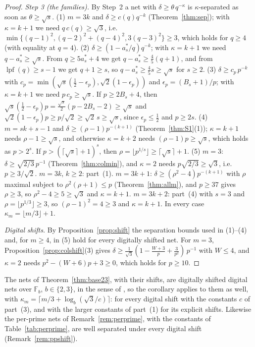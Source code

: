\documentclass[11pt]{amsart}
\theoremstyle{definition}
\theoremstyle{plain}
\newcommand{\F}{\mathbb{F}}
\begin{document}
\begin{proof}
\emph{Step 3 (the families).} By Step~2 a net with $\delta\ge\theta\,q^{-\kappa}$ is $\kappa$-separated as soon as $\theta\ge\sqrt s$.
(1) $m=3k$ and $\delta\ge c(q)q^{-k}$ (Theorem~\ref{thm:sep}); with $\kappa=k+1$ we need $q\,c(q)\ge\sqrt3$, i.e.\ $\min\{(q-1)^2,(q-2)^2+(q-4)^2,3(q-3)^2\}\ge3$, which holds for $q\ge4$ (with equality at $q=4$).
(2) $\delta\ge(1-a^*_s/q)q^{-k}$; with $\kappa=k+1$ we need $q-a^*_s\ge\sqrt s$. From $q\ge5a^*_s+4$ we get $q-a^*_s\ge\frac45(q+1)$, and from $\operatorname{lpf}(q)\ge s-1$ we get $q+1\ge s$, so $q-a^*_s\ge\frac45s\ge\sqrt s$ for $s\ge2$.
(3) $\delta\ge c_p\,p^{-k}$ with $c_p=\min(\sqrt s(\frac12-\epsilon_p),\sqrt2(1-\epsilon_p))$ and $\epsilon_p=(B_s+1)/p$; with $\kappa=k+1$ we need $p\,c_p\ge\sqrt s$. If $p\ge2B_s+4$, then $\sqrt s(\frac12-\epsilon_p)p=\frac{\sqrt s}2(p-2B_s-2)\ge\sqrt s$ and $\sqrt2(1-\epsilon_p)p\ge p/\sqrt2\ge\sqrt2\,s\ge\sqrt s$, since $\epsilon_p\le\frac12$ and $p\ge2s$.
(4) $m=sk+s-1$ and $\delta\ge(\rho-1)p^{-(k+1)}$ (Theorem~\ref{thm:S1}(1)); $\kappa=k+1$ needs $\rho-1\ge\sqrt s$, and otherwise $\kappa=k+2$ needs $(\rho-1)p\ge\sqrt s$, which holds as $p>2^s$. If $p>(\lceil\sqrt s\rceil+1)^s$, then $\rho=\lfloor p^{1/s}\rfloor\ge\lceil\sqrt s\rceil+1$.
(5) $m=3$: $\delta\ge\sqrt{2/3}\,p^{-1}$ (Theorem~\ref{thm:colmin}), and $\kappa=2$ needs $p\sqrt{2/3}\ge\sqrt3$, i.e.\ $p\ge3/\sqrt2$. $m=3k$, $k\ge2$: part~(1). $m=3k+1$: $\delta\ge(\rho^2-4)p^{-(k+1)}$ with $\rho$ maximal subject to $\rho^2(\rho+1)\le p$ (Theorem~\ref{thm:allm}), and $p\ge37$ gives $\rho\ge3$, so $\rho^2-4\ge5\ge\sqrt3$ and $\kappa=k+1$. $m=3k+2$: part~(4) with $s=3$ and $\rho=\lfloor p^{1/3}\rfloor\ge3$, so $(\rho-1)^2=4\ge3$ and $\kappa=k+1$. In every case $\kappa_m=\lfloor m/3\rfloor+1$.

\emph{Digital shifts.} By Proposition~\ref{prop:shift} the separation bounds used in (1)--(4) and, for $m\ge4$, in (5) hold for every digitally shifted net. For $m=3$, Proposition~\ref{prop:colshift}(3) gives $\delta\ge\frac1{\sqrt3}(1-\frac{W+3}p+\frac3{p^2})\,p^{-1}$ with $W\le4$, and $\kappa=2$ needs $p^2-(W+6)p+3\ge0$, which holds for $p\ge10$.
\end{proof}

The nets of Theorem~\ref{thm:base23}, with their shifts, are digitally shifted digital nets over $\F_b$, $b\in\{2,3\}$, in the sense of \cite[Def.~2.2]{DGS2}, so the corollary applies to them as well, with $\kappa_m=\lceil m/3+\log_b(\sqrt3/c)\rceil$: for every digital shift with the constants $c$ of part~(3), and with the larger constants of part~(1) for its explicit shifts. Likewise the per-prime nets of Remark~\ref{rem:perprime}, with the constants of Table~\ref{tab:perprime}, are well separated under every digital shift (Remark~\ref{rem:ppshift}).
\end{document}
